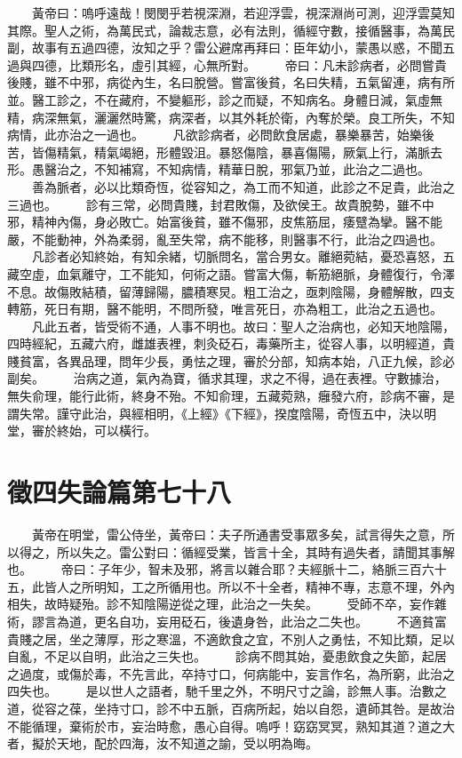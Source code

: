　　黃帝曰：嗚呼遠哉！閔閔乎若視深淵，若迎浮雲，視深淵尚可測，迎浮雲莫知其際。聖人之術，為萬民式，論裁志意，必有法則，循經守數，接循醫事，為萬民副，故事有五過四德，汝知之乎？雷公避席再拜曰：臣年幼小，蒙愚以惑，不聞五過與四德，比類形名，虛引其經，心無所對。
　　帝曰：凡未診病者，必問嘗貴後賤，雖不中邪，病從內生，名曰脫營。嘗富後貧，名曰失精，五氣留連，病有所並。醫工診之，不在藏府，不變軀形，診之而疑，不知病名。身體日減，氣虛無精，病深無氣，灑灑然時驚，病深者，以其外耗於衛，內奪於榮。良工所失，不知病情，此亦治之一過也。
　　凡欲診病者，必問飲食居處，暴樂暴苦，始樂後苦，皆傷精氣，精氣竭絕，形體毀沮。暴怒傷陰，暴喜傷陽，厥氣上行，滿脈去形。愚醫治之，不知補寫，不知病情，精華日脫，邪氣乃並，此治之二過也。
　　善為脈者，必以比類奇恆，從容知之，為工而不知道，此診之不足貴，此治之三過也。
　　診有三常，必問貴賤，封君敗傷，及欲侯王。故貴脫勢，雖不中邪，精神內傷，身必敗亡。始富後貧，雖不傷邪，皮焦筋屈，痿躄為攣。醫不能嚴，不能動神，外為柔弱，亂至失常，病不能移，則醫事不行，此治之四過也。
　　凡診者必知終始，有知余緒，切脈問名，當合男女。離絕菀結，憂恐喜怒，五藏空虛，血氣離守，工不能知，何術之語。嘗富大傷，斬筋絕脈，身體復行，令澤不息。故傷敗結積，留薄歸陽，膿積寒炅。粗工治之，亟刺陰陽，身體解散，四支轉筋，死日有期，醫不能明，不問所發，唯言死日，亦為粗工，此治之五過也。
　　凡此五者，皆受術不通，人事不明也。故曰：聖人之治病也，必知天地陰陽，四時經紀，五藏六府，雌雄表裡，刺灸砭石，毒藥所主，從容人事，以明經道，貴賤貧富，各異品理，問年少長，勇怯之理，審於分部，知病本始，八正九候，診必副矣。
　　治病之道，氣內為寶，循求其理，求之不得，過在表裡。守數據治，無失俞理，能行此術，終身不殆。不知俞理，五藏菀熟，癰發六府，診病不審，是謂失常。謹守此治，與經相明，《上經》《下經》，揆度陰陽，奇恆五中，決以明堂，審於終始，可以橫行。


\section{徵四失論篇第七十八}

　　黃帝在明堂，雷公侍坐，黃帝曰：夫子所通書受事眾多矣，試言得失之意，所以得之，所以失之。雷公對曰：循經受業，皆言十全，其時有過失者，請聞其事解也。
　　帝曰：子年少，智未及邪，將言以雜合耶？夫經脈十二，絡脈三百六十五，此皆人之所明知，工之所循用也。所以不十全者，精神不專，志意不理，外內相失，故時疑殆。診不知陰陽逆從之理，此治之一失矣。
　　受師不卒，妄作雜術，謬言為道，更名自功，妄用砭石，後遺身咎，此治之二失也。
　　不適貧富貴賤之居，坐之薄厚，形之寒溫，不適飲食之宜，不別人之勇怯，不知比類，足以自亂，不足以自明，此治之三失也。
　　診病不問其始，憂患飲食之失節，起居之過度，或傷於毒，不先言此，卒持寸口，何病能中，妄言作名，為所窮，此治之四失也。
　　是以世人之語者，馳千里之外，不明尺寸之論，診無人事。治數之道，從容之葆，坐持寸口，診不中五脈，百病所起，始以自怨，遺師其咎。是故治不能循理，棄術於市，妄治時愈，愚心自得。嗚呼！窈窈冥冥，熟知其道？道之大者，擬於天地，配於四海，汝不知道之諭，受以明為晦。

